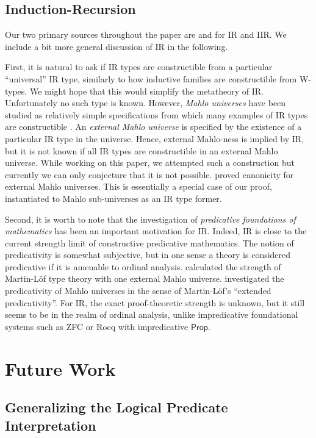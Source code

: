\documentclass[acmsmall,screen,review]{acmart}
\newcommand{\msf}[1]{{\mathsf{#1}}}
\begin{document}
\subsection{Induction-Recursion} Our two primary sources throughout the paper are
\cite{DBLP:journals/apal/DybjerS03} and \cite{DBLP:journals/jlp/DybjerS06} for IR and IIR. We include
a bit more general discussion of IR in the following.

First, it is natural to ask if IR types are constructible from a particular ``universal'' IR type,
similarly to how inductive families are constructible from W-types. We might hope that this would
simplify the metatheory of IR. Unfortunately no such type is known. However, \emph{Mahlo universes}
have been studied as relatively simple specifications from which many examples of IR types
are constructible \cite{setzer00mahlo}. An \emph{external Mahlo universe} is specified by the
existence of a particular IR type in the universe. Hence, external Mahlo-ness is implied by IR, but
it is not known if all IR types are constructible in an external Mahlo universe. While working on
this paper, we attempted such a construction but currently we can only conjecture that it is not
possible. \citet{mahlo-canonicity} proved canonicity for external Mahlo universes. This is
essentially a special case of our proof, instantiated to Mahlo sub-universes as an IR type former.

Second, it is worth to note that the investigation of \emph{predicative foundations of mathematics}
has been an important motivation for IR. Indeed, IR is close to the current strength limit of
constructive predicative mathematics. The notion of predicativity is somewhat
subjective, but in one sense a theory is considered predicative if it is amenable to ordinal
analysis. \citet{setzer00mahlo} calculated the strength of Martin-Löf type theory with one external
Mahlo universe. \citet{DBLP:journals/logcom/DybjerS24} investigated the predicativity of Mahlo
universes in the sense of Martin-Löf's ``extended predicativity''. For IR, the exact proof-theoretic
strength is unknown, but it still seems to be in the realm of ordinal analysis, unlike
impredicative foundational systems such as ZFC or Rocq with impredicative $\msf{Prop}$.

\section{Future Work}\label{sec:future-work}

\subsection{Generalizing the Logical Predicate Interpretation} \label{sec:generalizing-the-logical-predicate}
\end{document}
